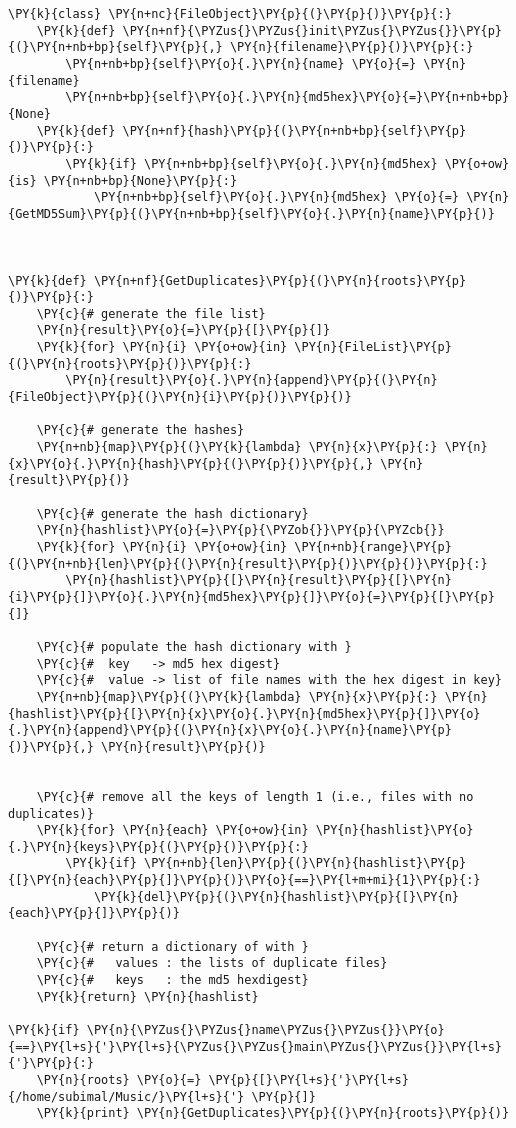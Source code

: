 \begin{Verbatim}[commandchars=\\\{\}]
\PY{k}{class} \PY{n+nc}{FileObject}\PY{p}{(}\PY{p}{)}\PY{p}{:}
    \PY{k}{def} \PY{n+nf}{\PYZus{}\PYZus{}init\PYZus{}\PYZus{}}\PY{p}{(}\PY{n+nb+bp}{self}\PY{p}{,} \PY{n}{filename}\PY{p}{)}\PY{p}{:}
        \PY{n+nb+bp}{self}\PY{o}{.}\PY{n}{name} \PY{o}{=} \PY{n}{filename}
        \PY{n+nb+bp}{self}\PY{o}{.}\PY{n}{md5hex}\PY{o}{=}\PY{n+nb+bp}{None}
    \PY{k}{def} \PY{n+nf}{hash}\PY{p}{(}\PY{n+nb+bp}{self}\PY{p}{)}\PY{p}{:}
        \PY{k}{if} \PY{n+nb+bp}{self}\PY{o}{.}\PY{n}{md5hex} \PY{o+ow}{is} \PY{n+nb+bp}{None}\PY{p}{:}
            \PY{n+nb+bp}{self}\PY{o}{.}\PY{n}{md5hex} \PY{o}{=} \PY{n}{GetMD5Sum}\PY{p}{(}\PY{n+nb+bp}{self}\PY{o}{.}\PY{n}{name}\PY{p}{)}



\PY{k}{def} \PY{n+nf}{GetDuplicates}\PY{p}{(}\PY{n}{roots}\PY{p}{)}\PY{p}{:}
    \PY{c}{# generate the file list}
    \PY{n}{result}\PY{o}{=}\PY{p}{[}\PY{p}{]}
    \PY{k}{for} \PY{n}{i} \PY{o+ow}{in} \PY{n}{FileList}\PY{p}{(}\PY{n}{roots}\PY{p}{)}\PY{p}{:}
        \PY{n}{result}\PY{o}{.}\PY{n}{append}\PY{p}{(}\PY{n}{FileObject}\PY{p}{(}\PY{n}{i}\PY{p}{)}\PY{p}{)}
    
    \PY{c}{# generate the hashes}
    \PY{n+nb}{map}\PY{p}{(}\PY{k}{lambda} \PY{n}{x}\PY{p}{:} \PY{n}{x}\PY{o}{.}\PY{n}{hash}\PY{p}{(}\PY{p}{)}\PY{p}{,} \PY{n}{result}\PY{p}{)}

    \PY{c}{# generate the hash dictionary}
    \PY{n}{hashlist}\PY{o}{=}\PY{p}{\PYZob{}}\PY{p}{\PYZcb{}}
    \PY{k}{for} \PY{n}{i} \PY{o+ow}{in} \PY{n+nb}{range}\PY{p}{(}\PY{n+nb}{len}\PY{p}{(}\PY{n}{result}\PY{p}{)}\PY{p}{)}\PY{p}{:}
        \PY{n}{hashlist}\PY{p}{[}\PY{n}{result}\PY{p}{[}\PY{n}{i}\PY{p}{]}\PY{o}{.}\PY{n}{md5hex}\PY{p}{]}\PY{o}{=}\PY{p}{[}\PY{p}{]}

    \PY{c}{# populate the hash dictionary with }
    \PY{c}{#  key   -> md5 hex digest}
    \PY{c}{#  value -> list of file names with the hex digest in key}
    \PY{n+nb}{map}\PY{p}{(}\PY{k}{lambda} \PY{n}{x}\PY{p}{:} \PY{n}{hashlist}\PY{p}{[}\PY{n}{x}\PY{o}{.}\PY{n}{md5hex}\PY{p}{]}\PY{o}{.}\PY{n}{append}\PY{p}{(}\PY{n}{x}\PY{o}{.}\PY{n}{name}\PY{p}{)}\PY{p}{,} \PY{n}{result}\PY{p}{)}


    \PY{c}{# remove all the keys of length 1 (i.e., files with no duplicates)}
    \PY{k}{for} \PY{n}{each} \PY{o+ow}{in} \PY{n}{hashlist}\PY{o}{.}\PY{n}{keys}\PY{p}{(}\PY{p}{)}\PY{p}{:}
        \PY{k}{if} \PY{n+nb}{len}\PY{p}{(}\PY{n}{hashlist}\PY{p}{[}\PY{n}{each}\PY{p}{]}\PY{p}{)}\PY{o}{==}\PY{l+m+mi}{1}\PY{p}{:}
            \PY{k}{del}\PY{p}{(}\PY{n}{hashlist}\PY{p}{[}\PY{n}{each}\PY{p}{]}\PY{p}{)}

    \PY{c}{# return a dictionary of with }
    \PY{c}{#   values : the lists of duplicate files}
    \PY{c}{#   keys   : the md5 hexdigest}
    \PY{k}{return} \PY{n}{hashlist}

\PY{k}{if} \PY{n}{\PYZus{}\PYZus{}name\PYZus{}\PYZus{}}\PY{o}{==}\PY{l+s}{'}\PY{l+s}{\PYZus{}\PYZus{}main\PYZus{}\PYZus{}}\PY{l+s}{'}\PY{p}{:}
    \PY{n}{roots} \PY{o}{=} \PY{p}{[}\PY{l+s}{'}\PY{l+s}{/home/subimal/Music/}\PY{l+s}{'} \PY{p}{]}
    \PY{k}{print} \PY{n}{GetDuplicates}\PY{p}{(}\PY{n}{roots}\PY{p}{)}
\end{Verbatim}
